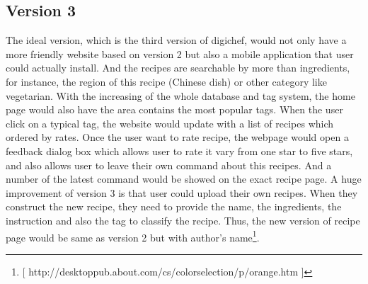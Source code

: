 \subsection{Version 3}
The ideal version, which is the third version of digichef, would not only have a more friendly website based on version 2 but also a mobile application that user could actually install. And the recipes are searchable by more than ingredients, for instance, the region of this recipe (Chinese dish) or other category like vegetarian. 
With the increasing of the whole database and tag system, the home page would also have the area contains the most popular tags. When the user click on a typical tag, the website would update with a list of recipes which ordered by rates. 
Once the user want to rate recipe, the webpage would open a feedback dialog box which allows user to rate it vary from one star to five stars, and also allows user to leave their own command about this recipes. And a number of the latest command would be showed on the exact recipe page. 
A huge improvement of version 3 is that user could upload their own recipes. When they construct the new recipe, they need to provide the name, the ingredients, the instruction and also the tag to classify the recipe. Thus, the new version of recipe page would be same as version 2 but with author’s name\footnote{[ http://desktoppub.about.com/cs/colorselection/p/orange.htm ]}. 

